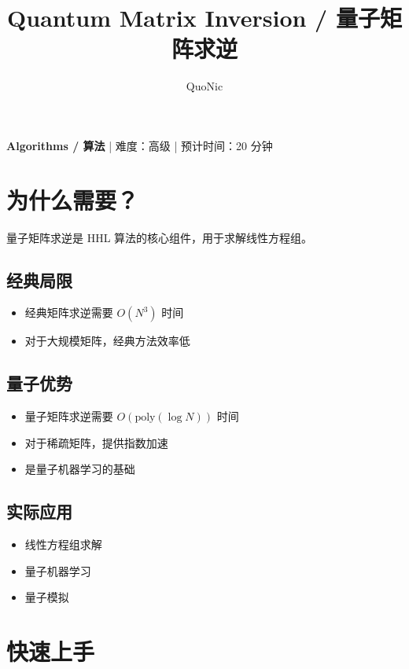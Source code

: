 \documentclass[12pt,a4paper]{article}
\title{Quantum Matrix Inversion / 量子矩阵求逆}
\author{QuoNic}
\date{}
\begin{document}
\maketitle

\begin{center}
\textbf{Algorithms / 算法} | 难度：高级 | 预计时间：20 分钟
\end{center}

\tableofcontents
\newpage

\section{为什么需要？}

量子矩阵求逆是 HHL 算法的核心组件，用于求解线性方程组。

\subsection{经典局限}
\begin{itemize}
  \item 经典矩阵求逆需要 $O(N^3)$ 时间
  \item 对于大规模矩阵，经典方法效率低
\end{itemize}

\subsection{量子优势}
\begin{itemize}
  \item 量子矩阵求逆需要 $O(\text{poly}(\log N))$ 时间
  \item 对于稀疏矩阵，提供指数加速
  \item 是量子机器学习的基础
\end{itemize}

\subsection{实际应用}
\begin{itemize}
  \item 线性方程组求解
  \item 量子机器学习
  \item 量子模拟
\end{itemize}

\section{快速上手}
\end{document}
